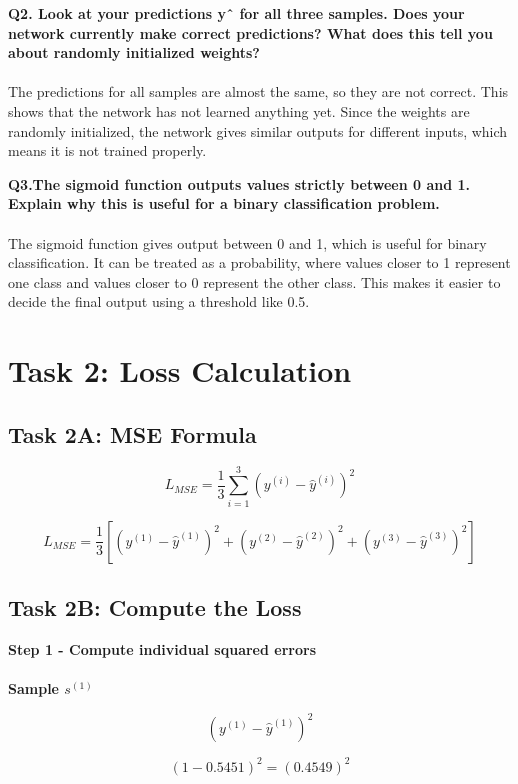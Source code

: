 \documentclass[runningheads]{llncs}
\begin{document}
\vspace{0.5cm}

\textbf{Q2. Look at your predictions yˆ for all three samples. Does your network currently make correct predictions? What does this tell you about randomly initialized weights?} 
\\ \\
The predictions for all samples are almost the same, so they are not correct. This shows that the network has not learned anything yet. Since the weights are randomly initialized, the network gives similar outputs for different inputs, which means it is not trained properly.

\vspace{0.5cm}

\textbf{Q3.The sigmoid function outputs values strictly between 0 and 1. Explain why this is useful for a binary classification problem.} 
\\ \\
The sigmoid function gives output between 0 and 1, which is useful for binary classification. It can be treated as a probability, where values closer to 1 represent one class and values closer to 0 represent the other class. This makes it easier to decide the final output using a threshold like 0.5.

\section{Task 2: Loss Calculation}
\subsection{Task 2A: MSE Formula}
\[
L_{MSE} = \frac{1}{3} \sum_{i=1}^{3}(y^{(i)} - \hat{y}^{(i)})^2
\]

\[
L_{MSE} = \frac{1}{3}[(y^{(1)}-\hat{y}^{(1)})^{2} + (y^{(2)}-\hat{y}^{(2)})^{2} + (y^{(3)}-\hat{y}^{(3)})^{2}]
\]

 \subsection{Task 2B: Compute the Loss}
\textbf{Step 1 - Compute individual squared errors\\ \\ }
\textbf{Sample $s^{(1)}$}

\[
(y^{(1)} - \hat{y}^{(1)})^2
\]

\[
(1 - 0.5451)^2 = (0.4549)^2
\]
\end{document}
